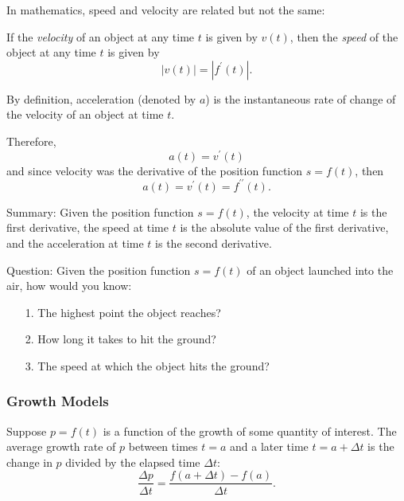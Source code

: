 \documentclass[14pt]{beamer}
\begin{document}
\begin{frame}

In mathematics, speed and velocity are related but not the same:

\bigskip

If the {\it velocity} of an object at any time $t$ is given by $v(t)$, then the {\it speed} of the object at any time $t$ is given by 
$$|v(t)|=|f^{\prime}(t)|.$$
\end{frame}

\begin{frame}
\small
By definition, acceleration (denoted by $a$) is the instantaneous rate of change of the velocity of an object at time $t$.

\bigskip

Therefore,
$$a(t)=v^{\prime}(t)$$
and since velocity was the derivative of the position function $s=f(t)$, then 
$$a(t)=v^{\prime}(t)=f^{\prime\prime}(t).$$

\bigskip

Summary:  Given the position function $s=f(t)$, the velocity at time $t$ is the first derivative, the speed at time $t$ is the absolute value of the first derivative, and the acceleration at time $t$ is the second derivative.
\end{frame}

\begin{frame}

Question:  Given the position function $s=f(t)$ of an object launched into the air, how would you know:

\begin{itemize}

\item[1.] The highest point the object reaches?

\item[2.] How long it takes to hit the ground?

\item[3.] The speed at which the object hits the ground?

\end{itemize}
\end{frame}

\begin{frame}
\frametitle{Growth Models}
Suppose $p=f(t)$ is a function of the growth of some quantity of interest.  The average growth rate of $p$ between times $t=a$ and a later time $t=a+\Delta t$ is the change in $p$ divided by the elapsed time $\Delta t$:
$$\frac{\Delta p}{\Delta t}=\frac{f(a+\Delta t)-f(a)}{\Delta t}.$$
\end{frame}
\end{document}
